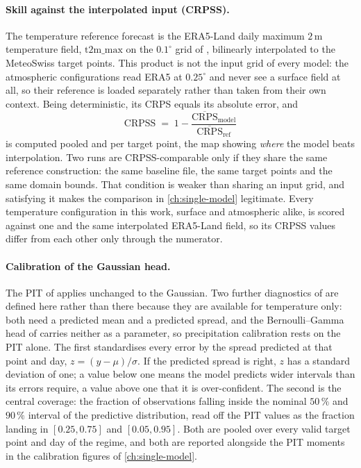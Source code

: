 \paragraph*{Skill against the interpolated input (CRPSS).}
The temperature reference forecast is the ERA5-Land daily maximum $2\,\mathrm{m}$ temperature field, $\mathrm{t2m\_max}$ on the $0.1^{\circ}$ grid of , bilinearly interpolated to the MeteoSwiss target points. This product is not the input grid of every model: the atmospheric configurations read ERA5 at $0.25^{\circ}$ and never see a surface field at all, so their reference is loaded separately rather than taken from their own context. Being deterministic, its CRPS equals its absolute error, and
\begin{equation}
    \mathrm{CRPSS} \;=\; 1 - \frac{\overline{\mathrm{CRPS}}_{\mathrm{model}}}{\overline{\mathrm{CRPS}}_{\mathrm{ref}}}
    \label{eq:crpss}
\end{equation}
is computed pooled and per target point, the map showing \emph{where} the model beats interpolation. Two runs are CRPSS-comparable only if they share the same reference construction: the same baseline file, the same target points and the same domain bounds. That condition is weaker than sharing an input grid, and satisfying it makes the comparison in \cref{ch:single-model} legitimate. Every temperature configuration in this work, surface and atmospheric alike, is scored against one and the same interpolated ERA5-Land field, so its CRPSS values differ from each other only through the numerator.

\paragraph*{Calibration of the Gaussian head.}
The PIT of  applies unchanged to the Gaussian. Two further diagnostics of  are defined here rather than there because they are available for temperature only: both need a predicted mean and a predicted spread, and the Bernoulli--Gamma head of  carries neither as a parameter, so precipitation calibration rests on the PIT alone. The first standardises every error by the spread predicted at that point and day, $z = (y - \mu)/\sigma$. If the predicted spread is right, $z$ has a standard deviation of one; a value below one means the model predicts wider intervals than its errors require, a value above one that it is over-confident. The second is the central coverage: the fraction of observations falling inside the nominal $50\,\%$ and $90\,\%$ interval of the predictive distribution, read off the PIT values as the fraction landing in $[0.25, 0.75]$ and $[0.05, 0.95]$. Both are pooled over every valid target point and day of the regime, and both are reported alongside the PIT moments in the calibration figures of \cref{ch:single-model}.

